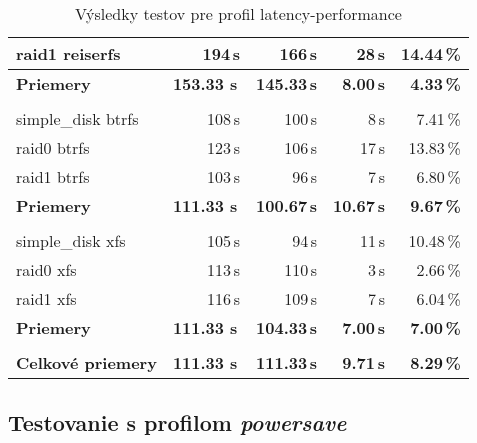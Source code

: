 \begin{table}[H]
\begin{center}
\begin{tabular}{|l|r r r r|}
    raid1 reiserfs & 194\,s & 166\,s & 28\,s & 14.44\,\% \\
    \hline
    \textbf{Priemery} & \textbf{153.33 s}\,& \textbf{145.33\,s} & \textbf{8.00\,s} & \textbf{4.33\,\%} \\
    \hline & \\[-1em]\hline
    simple\_disk btrfs & 108\,s & 100\,s & 8\,s & 7.41\,\% \\
    raid0 btrfs & 123\,s & 106\,s & 17\,s & 13.83\,\% \\
    raid1 btrfs & 103\,s & 96\,s & 7\,s & 6.80\,\% \\
    \hline
    \textbf{Priemery} & \textbf{111.33 s}\,& \textbf{100.67\,s} & \textbf{10.67\,s} & \textbf{9.67\,\%} \\
    \hline & \\[-1em]\hline
    simple\_disk xfs & 105\,s & 94\,s & 11\,s & 10.48\,\% \\
    raid0 xfs & 113\,s & 110\,s & 3\,s & 2.66\,\% \\
    raid1 xfs & 116\,s & 109\,s & 7\,s & 6.04\,\% \\
    \hline
    \textbf{Priemery} & \textbf{111.33 s}\,& \textbf{104.33\,s} & \textbf{7.00\,s} & \textbf{7.00\,\%} \\
    \hline & \\[-1em]\hline
    \textbf{Celkové priemery} & \textbf{111.33 s}\,& \textbf{111.33\,s} & \textbf{9.71\,s} & \textbf{8.29\,\%} \\
    \hline
\end{tabular}
\caption{Výsledky testov pre profil latency-performance}
\label{tab:results-xfs}
\end{center}
\end{table}

\subsection{Testovanie s profilom \emph{powersave}}


